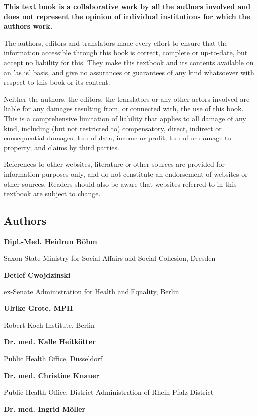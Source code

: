\documentclass{article}
\begin{document}
\textbf{This text book is a collaborative work by all the authors involved and does not represent the opinion of individual institutions for which the authors work.}


The authors, editors and translators made every effort to ensure that the information accessible through this book is correct, complete or up-to-date, but accept no liability for this. They make this textbook and its contents available on an 'as is' basis, and give no assurances or guarantees of any kind whatsoever with respect to this book or its content.


Neither the authors, the editors, the translators or any other actors involved are liable for any damages resulting from, or connected with, the use of this book. This is a comprehensive limitation of liability that applies to all damage of any kind, including (but not restricted to) compensatory, direct, indirect or consequential damages; loss of data, income or profit; loss of or damage to property; and claims by third parties.


References to other websites, literature or other sources are provided for information purposes only, and do not constitute an endorsement of websites or other sources. Readers should also be aware that websites referred to in this textbook are subject to change.




\subsection{Authors}\label{H7919849}



\textbf{Dipl.-Med. Heidrun Böhm}

Saxon State Ministry for Social Affairs and Social Cohesion, Dresden


\textbf{Detlef Cwojdzinski}

ex-Senate Administration for Health and Equality, Berlin


\textbf{Ulrike Grote, MPH}

Robert Koch Institute, Berlin


\textbf{Dr. med. Kalle Heitkötter}

Public Health Office, Düsseldorf


\textbf{Dr. med. Christine Knauer}

Public Health Office, District Administration of Rhein-Pfalz District


\textbf{Dr. med. Ingrid Möller}
\end{document}
